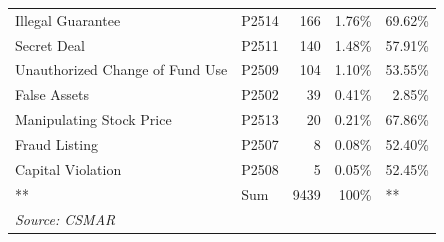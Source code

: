 \documentclass{beamer}[10]
\begin{document}
{\begin{table}[htbp]
\begin{tabular}{lllll}
    Illegal Guarantee & P2514 & \multicolumn{1}{r}{166} & \multicolumn{1}{r}{1.76\%} & \multicolumn{1}{r}{69.62\%} \\
    Secret Deal & P2511 & \multicolumn{1}{r}{140} & \multicolumn{1}{r}{1.48\%} & \multicolumn{1}{r}{57.91\%} \\
    Unauthorized Change of Fund Use & P2509 & \multicolumn{1}{r}{104} & \multicolumn{1}{r}{1.10\%} & \multicolumn{1}{r}{53.55\%} \\
    False Assets & P2502 & \multicolumn{1}{r}{39} & \multicolumn{1}{r}{0.41\%} & \multicolumn{1}{r}{2.85\%} \\
    Manipulating Stock Price & P2513 & \multicolumn{1}{r}{20} & \multicolumn{1}{r}{0.21\%} & \multicolumn{1}{r}{67.86\%} \\
    Fraud Listing & P2507 & \multicolumn{1}{r}{8} & \multicolumn{1}{r}{0.08\%} & \multicolumn{1}{r}{52.40\%} \\
    Capital Violation & P2508 & \multicolumn{1}{r}{5} & \multicolumn{1}{r}{0.05\%} & \multicolumn{1}{r}{52.45\%} \\
    **    & Sum   & \multicolumn{1}{r}{9439} & \multicolumn{1}{r}{100\%} & ** \\
    \multicolumn{5}{l}{\textit{Source: CSMAR}} \\
    \end{tabular}%
  \label{tab:addlabel}%
\end{table}%

}
\end{document}

